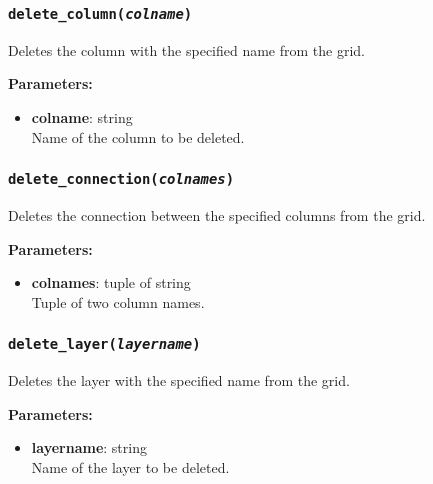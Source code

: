 \begin{snugshade}\subsubsection{\texttt{delete\_column(\emph{colname})}}\end{snugshade}
\label{sec:mulgrid:delete_column}

Deletes the column with the specified name from the grid.

\textbf{Parameters:}
\begin{itemize}
\item \textbf{colname}: string\\
  Name of the column to be deleted.
\end{itemize}

\begin{snugshade}\subsubsection{\texttt{delete\_connection(\emph{colnames})}}\end{snugshade}
\label{sec:mulgrid:delete_connection}

Deletes the connection between the specified columns from the grid.

\textbf{Parameters:}
\begin{itemize}
\item \textbf{colnames}: tuple of string\\
  Tuple of two column names.
\end{itemize}

\begin{snugshade}\subsubsection{\texttt{delete\_layer(\emph{layername})}}\end{snugshade}
\label{sec:mulgrid:delete_layer}

Deletes the layer with the specified name from the grid.

\textbf{Parameters:}
\begin{itemize}
\item \textbf{layername}: string\\
  Name of the layer to be deleted.
\end{itemize}

